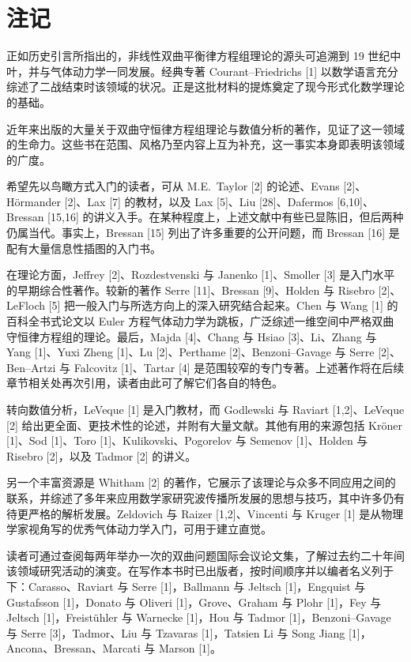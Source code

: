 \documentclass[../../main.tex]{subfiles}
\begin{document}

\section{注记}\label{section:ch03-注记}

正如历史引言所指出的，非线性双曲平衡律方程组理论的源头可追溯到 19 世纪中叶，并与气体动力学一同发展。经典专著 Courant--Friedrichs [1] 以数学语言充分综述了二战结束时该领域的状况。正是这批材料的提炼奠定了现今形式化数学理论的基础。

近年来出版的大量关于双曲守恒律方程组理论与数值分析的著作，见证了这一领域的生命力。这些书在范围、风格乃至内容上互为补充，这一事实本身即表明该领域的广度。

希望先以鸟瞰方式入门的读者，可从 M.E.~Taylor [2] 的论述、Evans [2]、Hörmander [2]、Lax [7] 的教材，以及 Lax [5]、Liu [28]、Dafermos [6,10]、Bressan [15,16] 的讲义入手。在某种程度上，上述文献中有些已显陈旧，但后两种仍属当代。事实上，Bressan [15] 列出了许多重要的公开问题，而 Bressan [16] 是配有大量信息性插图的入门书。

在理论方面，Jeffrey [2]、Rozdestvenski 与 Janenko [1]、Smoller [3] 是入门水平的早期综合性著作。较新的著作 Serre [11]、Bressan [9]、Holden 与 Risebro [2]、LeFloch [5] 把一般入门与所选方向上的深入研究结合起来。Chen 与 Wang [1] 的百科全书式论文以 Euler 方程气体动力学为跳板，广泛综述一维空间中严格双曲守恒律方程组的理论。最后，Majda [4]、Chang 与 Hsiao [3]、Li、Zhang 与 Yang [1]、Yuxi Zheng [1]、Lu [2]、Perthame [2]、Benzoni--Gavage 与 Serre [2]、Ben--Artzi 与 Falcovitz [1]、Tartar [4] 是范围较窄的专门专著。上述著作将在后续章节相关处再次引用，读者由此可了解它们各自的特色。

转向数值分析，LeVeque [1] 是入门教材，而 Godlewski 与 Raviart [1,2]、LeVeque [2] 给出更全面、更技术性的论述，并附有大量文献。其他有用的来源包括 Kröner [1]、Sod [1]、Toro [1]、Kulikovski、Pogorelov 与 Semenov [1]、Holden 与 Risebro [2]，以及 Tadmor [2] 的讲义。

另一个丰富资源是 Whitham [2] 的著作，它展示了该理论与众多不同应用之间的联系，并综述了多年来应用数学家研究波传播所发展的思想与技巧，其中许多仍有待更严格的解析发展。Zeldovich 与 Raizer [1,2]、Vincenti 与 Kruger [1] 是从物理学家视角写的优秀气体动力学入门，可用于建立直觉。

读者可通过查阅每两年举办一次的双曲问题国际会议论文集，了解过去约二十年间该领域研究活动的演变。在写作本书时已出版者，按时间顺序并以编者名义列于下：Carasso、Raviart 与 Serre [1]，Ballmann 与 Jeltsch [1]，Engquist 与 Gustafsson [1]，Donato 与 Oliveri [1]，Grove、Graham 与 Plohr [1]，Fey 与 Jeltsch [1]，Freistühler 与 Warnecke [1]，Hou 与 Tadmor [1]，Benzoni--Gavage 与 Serre [3]，Tadmor、Liu 与 Tzavaras [1]，Tatsien Li 与 Song Jiang [1]，Ancona、Bressan、Marcati 与 Marson [1]。
\end{document}
